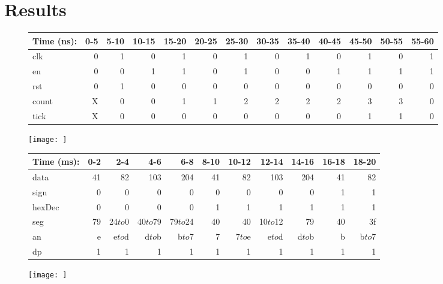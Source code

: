 \documentclass[11pt]{article}
\begin{document}
\section*{Results}

\begin{figure}[ht]\centering
	
	\begin{tabular}{l|rrrrrrrrrrrr}	
		Time (ns): & 0-5 & 5-10 & 10-15 & 15-20 & 20-25 & 25-30 & 30-35 & 35-40 & 40-45 & 45-50 & 50-55 & 55-60 \\
		\midrule
		clk     & 0 & 1 & 0 & 1 & 0 & 1 & 0 & 1 & 0 & 1 & 0 & 1\\
		en  	& 0 & 0 & 1 & 1 & 0 & 1 & 0 & 0 & 1 & 1 & 1 & 1\\
		rst 	& 0 & 1 & 0 & 0 & 0	& 0 & 0 & 0 & 0	& 0 & 0 & 0\\
		\midrule
		count 	& X & 0 & 0 & 1 & 1 & 2 & 2	& 2 & 2 & 3 & 3 & 0 \\
		tick	& X & 0 & 0 & 0 & 0 & 0 & 0	& 0 & 0 & 1 & 1 & 0 \\
		\bottomrule
	\end{tabular}
	\bigskip
	\texttt{[image: ]}
	\caption{}
	\label{fig:sim_with_table}
\end{figure}

\begin{figure}[ht]\centering
	
	\begin{tabular}{l|rrrrrrrrrr}
		Time (ms): & 0-2 & 2-4 & 4-6 & 6-8 & 8-10 & 10-12 & 12-14 & 14-16 & 16-18 & 18-20\\
		\midrule
		data  & 41 & 82 & 103      & 204 & 41 & 	  82 & 103 & 	   204 & 41 & 82 \\
		sign  & 0 & 0 & 0      & 0 & 0 &   	  0 & 0 & 	   0 & 1 & 1 \\
		hexDec & 0& 0 & 0      & 0 & 1 &      1 & 1 &      1 & 1 & 1 \\ 
		\midrule
		seg   & 79 & 24$to$0 & 40$to$79 & 79$to$24 & 40 & 40 & 10$to$12 & 79 & 40 & 3f \\
		an    & e  & e$to$d & d$to$b & b$to$7 & 7 & 7$to$e & e$to$d & d$to$b & b & b$to$7 \\
		dp    & 1  & 1      & 1      & 1      & 1 &      1 & 1      & 1      & 1 & 1      \\ 
		\bottomrule
	\end{tabular}
	\bigskip
	\texttt{[image: ]}
	\caption{}
	\label{fig:sim_with_table}
\end{figure}
\end{document}
